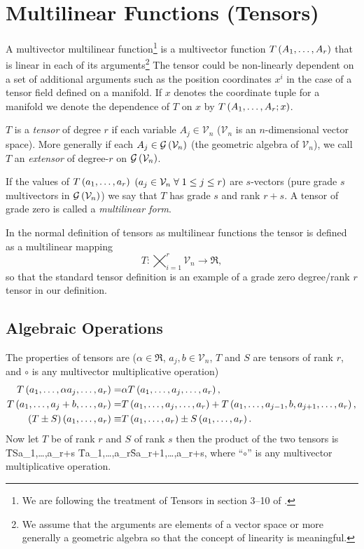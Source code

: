 \chapter{Multilinear Functions (Tensors)}

A multivector multilinear function\footnote{We are following the treatment of Tensors in section 3--10 of \cite{H&S}.} is a 
multivector function ${T}\left ( {A_{1},\dots,A_{r}} \right )$ that is linear in each of its arguments\footnote{We assume that the arguments 
are elements of a vector space or more generally a geometric algebra so that the concept of linearity is meaningful.} 
The tensor could be non-linearly dependent on a set of additional arguments such as the position coordinates $x^{i}$ in the 
case of a tensor field defined on a manifold.  If $x$ denotes the coordinate tuple for a manifold we denote the dependence 
of $T$ on $x$ by ${T}\left ( {A_{1},\dots,A_{r};x} \right )$.
 
$T$ is a \emph{tensor} of degree $r$ if each variable $A_{j} \in \mathcal{V}_{n}$ ($\mathcal{V}_{n}$ is an 
$n$-dimensional vector space).  More generally if each 
$A_{j}\in{\mathcal{G}}\left ( {\mathcal{V}_{n}} \right )$ (the geometric algebra of $\mathcal{V}_{n}$), we call $T$ an \emph{extensor} of
degree-$r$ on ${\mathcal{G}}\left ( {\mathcal{V}_{n}} \right )$.

If the values of ${T}\left ( {a_{1},\dots,a_{r}} \right )$ $\left ( a_{j}\in\mathcal{V}_{n}\;\forall\; 1\le j \le r \right )$ are $s$-vectors 
(pure grade $s$ multivectors in 
${\mathcal{G}}\left ( {\mathcal{V}_{n}} \right )$) we say that $T$ has grade $s$ and rank $r+s$.  A tensor of grade zero is called a
\emph{multilinear form}.

In the normal definition of tensors as multilinear functions the tensor is defined as a multilinear mapping 
$$T:\bigtimes_{i=1}^{r}\mathcal{V}_{n}\rightarrow\Re,$$ so that the standard tensor definition is an example of a grade zero
degree/rank $r$ tensor in our definition.

\section{Algebraic Operations}
The properties of tensors are ($\alpha\in\Re$, $a_{j},b\in\mathcal{V}_{n}$, $T$ and $S$ are tensors of rank $r$,
and $\circ$ is any multivector multiplicative operation)
\begin{align}
	{T}\left ( {a_{1},\dots,\alpha a_{j},\dots,a_{r}} \right ) =& \alpha{T}\left ( {a_{1},\dots,a_{j},\dots,a_{r}} \right ), \\
	{T}\left ( {a_{1},\dots,a_{j}+b,\dots,a_{r}} \right ) =& {T}\left ( {a_{1},\dots,a_{j},\dots,a_{r}} \right )+ {T}\left ( {a_{1},\dots,a_{j-1},b,a_{j+1},\dots,a_{r}} \right ), \\
	{\left ( T\pm S\right )}\left ( {a_{1},\dots,a_{r}} \right ) \equiv& {T}\left ( {a_{1},\dots,a_{r}} \right )\pm{S}\left ( {a_{1},\dots,a_{r}} \right ).
\end{align}
Now let $T$ be of rank $r$ and $S$ of rank $s$ then the product of the two tensors is
\be
	\f{\lp T\circ S\rp}{a_{1},\dots,a_{r+s}} \equiv \f{T}{a_{1},\dots,a_{r}}\circ\f{S}{a_{r+1},\dots,a_{r+s}},
\ee
where ``$\circ$'' is any multivector multiplicative operation.

